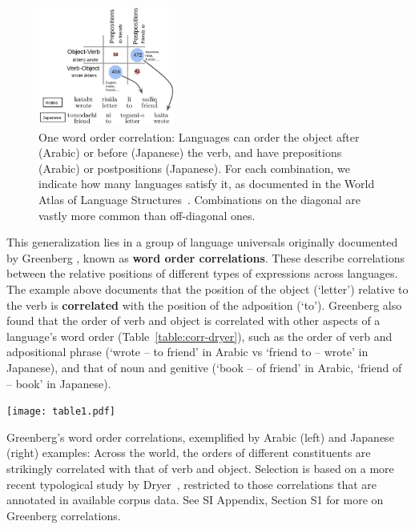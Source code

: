 \documentclass[9pt,twocolumn,twoside,lineno]{pnas-new}
\newcommand{\key}[1]{\textbf{#1}}
\begin{document}
\begin{figure}
    \centering
    \includegraphics[width=0.4\textwidth]{figure1.pdf}
\caption{ One word order correlation: Languages can order the object after (Arabic) or before (Japanese) the verb, and have prepositions (Arabic) or postpositions (Japanese). For each combination, we indicate how many languages satisfy it, as documented in the World Atlas of Language Structures~\cite{wals}. Combinations on the diagonal are vastly more common than off-diagonal ones. 
	}\label{fig:arabic-japanese-simple}	\label{fig:corr-table}
\end{figure}


This generalization lies in a group of language universals originally documented by Greenberg \cite{greenberg1963universals}, known as \key{word order correlations}.
These describe correlations between the relative positions of different types of expressions across languages.
The example above documents that the position of the object (`letter') relative to the verb is \key{correlated} with the position of the adposition (`to'). %
Greenberg also found that the order of verb and object is correlated with other aspects of a language's word order (Table~\ref{table:corr-dryer}), such as the order of verb and adpositional phrase (`wrote -- to friend' in Arabic vs `friend to -- wrote' in Japanese), and that of noun and genitive (`book -- of friend' in Arabic, `friend of -- book' in Japanese).

\begin{table}[ht]
	\begin{center}
    \texttt{[image: table1.pdf]}
	\end{center}
	\caption{Greenberg's word order correlations, exemplified by Arabic (left) and Japanese (right) examples: Across the world, the orders of different constituents are strikingly correlated with that of verb and object.
	Selection is based on a more recent typological study by Dryer~\cite{dryer1992greenbergian}, restricted to those correlations that are annotated in available corpus data. See SI Appendix, Section S1 for more on Greenberg correlations.
	}\label{table:corr-dryer}
\end{table}
\end{document}
